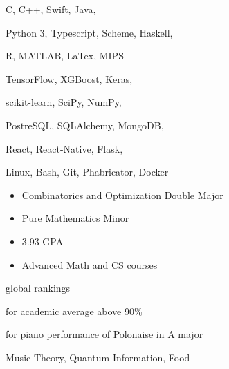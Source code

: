 C, C++, Swift, Java,
\smallskip

Python 3, Typescript, Scheme, Haskell,
\smallskip

R, MATLAB, LaTex, MIPS

\divider\smallskip

TensorFlow, XGBoost, Keras,
\smallskip

scikit-learn, SciPy, NumPy,
\smallskip

PostreSQL, SQLAlchemy, MongoDB,
\smallskip

React, React-Native, Flask,

\divider\smallskip

Linux, Bash, Git, Phabricator, Docker


\begin{itemize}
    \item Combinatorics and Optimization Double Major
    \item Pure Mathematics Minor
    \item 3.93 GPA
    \item Advanced Math and CS courses
\end{itemize}


global rankings

\divider\smallskip

for academic average above 90\%

\divider\smallskip

for piano performance of Polonaise in A major

\divider\smallskip


Music Theory, Quantum Information, Food
